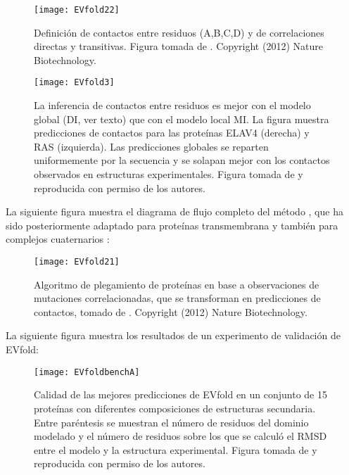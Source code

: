 \begin{figure}
\begin{center} 
\texttt{[image: EVfold22]}
\caption%
{
Definici\'{o}n de contactos entre residuos (A,B,C,D) y de correlaciones directas y transitivas.
Figura tomada de \cite{Marks2012}. Copyright (2012) Nature Biotechnology.
}
\label{fig:EVfold1.1}
\end{center}
\end{figure} %

\begin{figure}
\begin{center} 
\texttt{[image: EVfold3]}
\caption%
{
La inferencia de contactos entre residuos es mejor con el modelo global (DI, ver texto) que con el modelo local MI.
La figura muestra predicciones de contactos para las prote\'{i}nas ELAV4 (derecha) y RAS (izquierda).
Las predicciones globales se reparten uniformemente por la secuencia y se solapan mejor con los contactos observados en estructuras experimentales.
Figura tomada de \cite{Marks2011} y reproducida con permiso de los autores.
}
\label{fig:EVfold2}
\end{center}
\end{figure}

La siguiente figura muestra el diagrama de flujo completo del m\'{e}todo , 
que ha sido posteriormente adaptado para prote\'{i}nas transmembrana \citep{Hopf2012} y 
tambi\'{e}n para complejos cuaternarios \citep{Hopf2014}:

\begin{figure}
\begin{center} 
\texttt{[image: EVfold21]}
\caption%
{
Algoritmo de plegamiento de prote\'{i}nas en base a observaciones de mutaciones correlacionadas,
que se transforman en predicciones de contactos, tomado de \cite{Marks2012}. Copyright (2012) Nature Biotechnology.
}
\label{fig:EVfold3} %
\end{center}
\end{figure}

La siguiente figura muestra los resultados de un experimento de validaci\'{o}n de EVfold:

\begin{figure}
\begin{center} 
\texttt{[image: EVfoldbenchA]}
\caption%
{
Calidad de las mejores predicciones de EVfold en un conjunto de 15 prote\'{i}nas con diferentes composiciones de estructuras secundaria.
Entre par\'{e}ntesis se muestran el n\'{u}mero de residuos del dominio modelado y 
el n\'{u}mero de residuos sobre los que se calcul\'{o} el RMSD entre el modelo y la estructura experimental.
Figura tomada de \cite{Marks2011} y reproducida con permiso de los autores.
}
\label{fig:EVfold4}
\end{center}
\end{figure}

